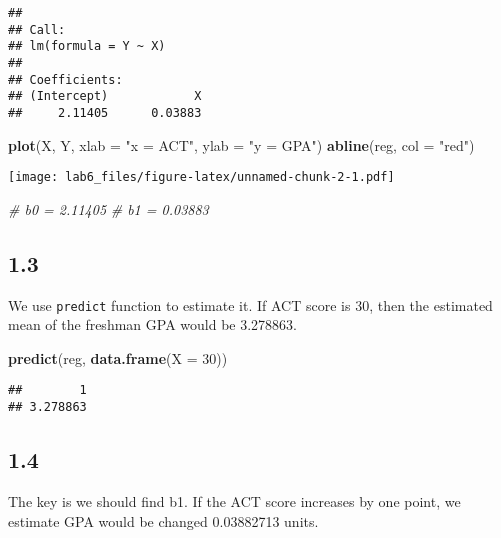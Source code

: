 \documentclass[
]{article}
\newenvironment{Shaded}{\begin{snugshade}}{\end{snugshade}}
\newcommand{\CommentTok}[1]{\textcolor[rgb]{0.56,0.35,0.01}{\textit{#1}}}
\newcommand{\DataTypeTok}[1]{\textcolor[rgb]{0.13,0.29,0.53}{#1}}
\newcommand{\DecValTok}[1]{\textcolor[rgb]{0.00,0.00,0.81}{#1}}
\newcommand{\KeywordTok}[1]{\textcolor[rgb]{0.13,0.29,0.53}{\textbf{#1}}}
\newcommand{\NormalTok}[1]{#1}
\newcommand{\StringTok}[1]{\textcolor[rgb]{0.31,0.60,0.02}{#1}}
\begin{document}
\begin{verbatim}
## 
## Call:
## lm(formula = Y ~ X)
## 
## Coefficients:
## (Intercept)            X  
##     2.11405      0.03883
\end{verbatim}

\begin{Shaded}
\begin{Highlighting}[]
\KeywordTok{plot}\NormalTok{(X, Y, }\DataTypeTok{xlab =} \StringTok{"x = ACT"}\NormalTok{, }\DataTypeTok{ylab =} \StringTok{"y = GPA"}\NormalTok{)}
\KeywordTok{abline}\NormalTok{(reg, }\DataTypeTok{col =} \StringTok{"red"}\NormalTok{)}
\end{Highlighting}
\end{Shaded}

\texttt{[image: lab6\_files/figure-latex/unnamed-chunk-2-1.pdf]}

\begin{Shaded}
\begin{Highlighting}[]
\CommentTok{# b0 =  2.11405   }
\CommentTok{# b1 = 0.03883  }
\end{Highlighting}
\end{Shaded}

\hypertarget{section-2}{%
\subsection{1.3}\label{section-2}}

We use \texttt{predict} function to estimate it. If ACT score is 30,
then the estimated mean of the freshman GPA would be 3.278863.

\begin{Shaded}
\begin{Highlighting}[]
\KeywordTok{predict}\NormalTok{(reg, }\KeywordTok{data.frame}\NormalTok{(}\DataTypeTok{X =} \DecValTok{30}\NormalTok{))}
\end{Highlighting}
\end{Shaded}

\begin{verbatim}
##        1 
## 3.278863
\end{verbatim}

\hypertarget{section-3}{%
\subsection{1.4}\label{section-3}}

The key is we should find b1. If the ACT score increases by one point,
we estimate GPA would be changed 0.03882713 units.
\end{document}
